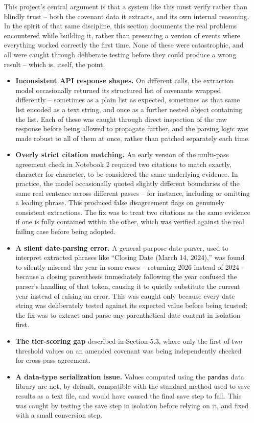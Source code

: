 \documentclass[11pt,a4paper]{article}
\begin{document}
This project's central argument is that a system like this must verify rather than blindly trust -- both the covenant data it extracts, and its own internal reasoning. In the spirit of that same discipline, this section documents the real problems encountered while building it, rather than presenting a version of events where everything worked correctly the first time. None of these were catastrophic, and all were caught through deliberate testing before they could produce a wrong result -- which is, itself, the point.

\begin{itemize}[leftmargin=1.4em]
\item \textbf{Inconsistent API response shapes.} On different calls, the extraction model occasionally returned its structured list of covenants wrapped differently -- sometimes as a plain list as expected, sometimes as that same list encoded as a text string, and once as a further nested object containing the list. Each of these was caught through direct inspection of the raw response before being allowed to propagate further, and the parsing logic was made robust to all of them at once, rather than patched separately each time.
\item \textbf{Overly strict citation matching.} An early version of the multi-pass agreement check in Notebook 2 required two citations to match exactly, character for character, to be considered the same underlying evidence. In practice, the model occasionally quoted slightly different boundaries of the same real sentence across different passes -- for instance, including or omitting a leading phrase. This produced false disagreement flags on genuinely consistent extractions. The fix was to treat two citations as the same evidence if one is fully contained within the other, which was verified against the real failing case before being adopted.
\item \textbf{A silent date-parsing error.} A general-purpose date parser, used to interpret extracted phrases like ``Closing Date (March 14, 2024),'' was found to silently misread the year in some cases -- returning 2026 instead of 2024 -- because a closing parenthesis immediately following the year confused the parser's handling of that token, causing it to quietly substitute the current year instead of raising an error. This was caught only because every date string was deliberately tested against its expected value before being trusted; the fix was to extract and parse any parenthetical date content in isolation first.
\item \textbf{The tier-scoring gap} described in Section 5.3, where only the first of two threshold values on an amended covenant was being independently checked for cross-pass agreement.
\item \textbf{A data-type serialization issue.} Values computed using the \texttt{pandas} data library are not, by default, compatible with the standard method used to save results as a text file, and would have caused the final save step to fail. This was caught by testing the save step in isolation before relying on it, and fixed with a small conversion step.
\end{itemize}
\end{document}
